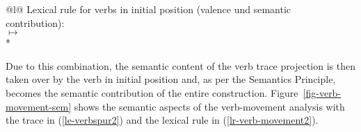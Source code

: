 {{\ea
\begin{tabular}[t]{@{}l@{}}
Lexical rule for verbs in initial position (valence und semantic\\
contribution):\\
 $\mapsto$\\*
\end{tabular}
\label{lr-verb-movement2}
\z


Due to this combination, the semantic content of the verb trace projection is then taken over by the verb 
in initial position and, as per the Semantics Principle, becomes the semantic contribution of the entire 
construction. Figure~\vref{fig-verb-movement-sem} shows the semantic aspects of the verb-movement analysis with the
trace in (\ref{le-verbspur2}) and the lexical rule in (\ref{lr-verb-movement2}).

}}
